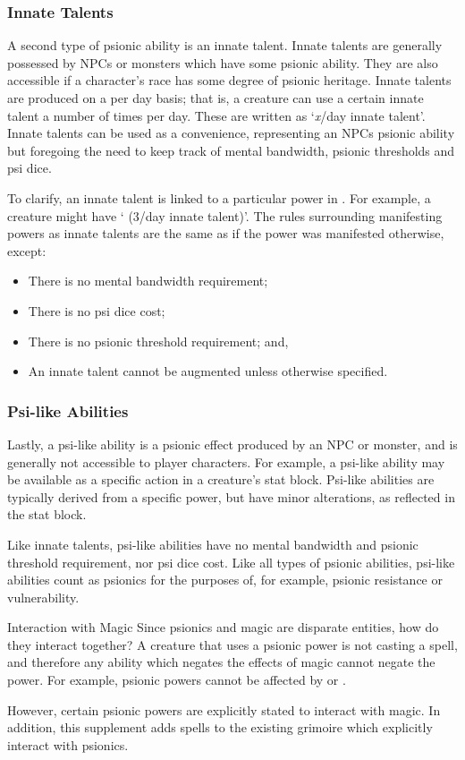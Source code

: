 \subsubsection{Innate Talents}
A second type of psionic ability is an innate talent.
Innate talents are generally possessed by NPCs or
monsters which have some psionic ability.
They are also accessible if a character's race
has some degree of psionic heritage.
Innate talents are produced on a per day basis;
that is, a creature can use a certain innate talent
a number of times per day.
These are written as `\textit{x}/day innate talent'.
Innate talents can be used as a convenience,
representing an NPCs psionic ability but
foregoing the need to keep track of mental bandwidth,
psionic thresholds and psi dice.

To clarify,
an innate talent is linked to a particular power
in .
For example,
a creature might have
` (3/day innate talent)'.
The rules surrounding manifesting powers
as innate talents are the same as if
the power was manifested otherwise, except:
\begin{itemize}
    \item There is no mental bandwidth requirement;
    \item There is no psi dice cost;
    \item There is no psionic threshold requirement; and,
    \item An innate talent cannot be augmented unless
        otherwise specified.
\end{itemize}

\subsubsection{Psi-like Abilities}
Lastly, a psi-like ability is a psionic effect produced by an NPC or monster,
and is generally not accessible to player characters.
For example, a psi-like ability may be available as a specific
action in a creature's stat block.
Psi-like abilities are typically derived from a specific power,
but have minor alterations, as reflected in the stat block.

Like innate talents,
psi-like abilities have no mental bandwidth and psionic threshold requirement,
nor psi dice cost.
Like all types of psionic abilities,
psi-like abilities count as psionics for the purposes of, for example,
psionic resistance or vulnerability.

\begin{DndSidebar}[float=htbp]{Interaction with Magic}
    Since
    psionics and magic are disparate entities,
    how do they interact together?
    A creature that uses a psionic power is not
    casting a spell,
    and therefore any ability which negates the effects
    of magic cannot negate the power.
    For example, psionic powers cannot be affected by
     or .

    However, certain psionic powers are explicitly stated
    to interact with magic.
    In addition, this supplement adds spells to the existing
    grimoire which explicitly interact with psionics.
\end{DndSidebar}

